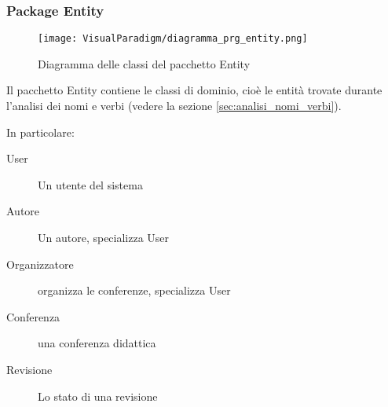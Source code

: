 \subsubsection{Package Entity}
\label{sec:entity}
\begin{figure}[H] 
  \centering
  \texttt{[image: VisualParadigm/diagramma\_prg\_entity.png]}
  \caption{Diagramma delle classi del pacchetto Entity}
  \label{fig:diagramma_entity}
\end{figure}

Il pacchetto Entity contiene le classi di dominio, cioè
le entità trovate durante l'analisi dei nomi e verbi (vedere la
sezione \ref{sec:analisi_nomi_verbi}).

In particolare:
\begin{description}
\item[User] Un utente del sistema
\item[Autore] Un autore, specializza User
\item[Organizzatore] organizza le conferenze, specializza User
\item[Conferenza] una conferenza didattica
\item[Revisione] Lo stato di una revisione
\end{description}
